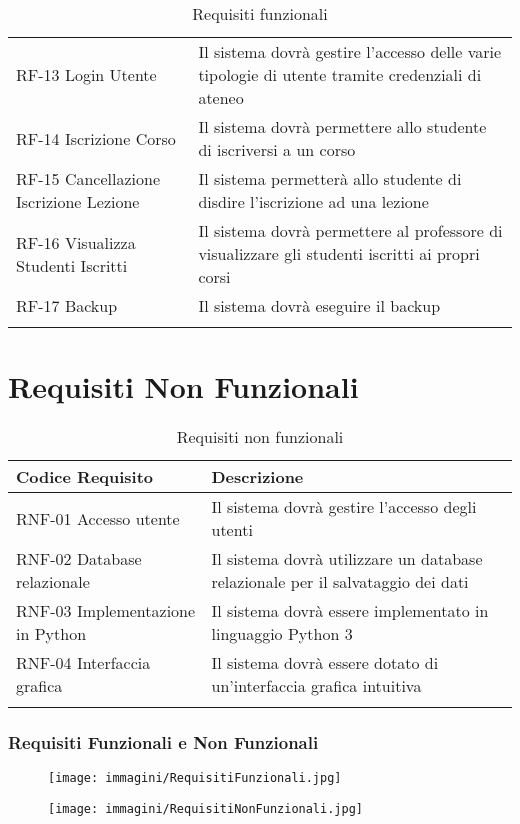 \documentclass[11pt,a4paper]{report}
\begin{document}
\begin{longtable}{>{\raggedright\arraybackslash}p{5cm} >{\raggedright\arraybackslash}p{10cm}}
RF-13 Login Utente & Il sistema dovrà gestire l’accesso delle varie tipologie di utente tramite credenziali di ateneo \\
\rowcolor{rowgray}
RF-14 Iscrizione Corso & Il sistema dovrà permettere allo studente di iscriversi a un corso \\
\rowcolor{white}
RF-15 Cancellazione Iscrizione Lezione & Il sistema permetterà allo studente di disdire l'iscrizione ad una lezione\\
\rowcolor{rowgray}
RF-16 Visualizza Studenti Iscritti& Il sistema dovrà permettere al professore di visualizzare gli studenti iscritti ai propri corsi \\
\rowcolor{white}
RF-17 Backup & Il sistema dovrà eseguire il backup\\
\bottomrule
\caption{Requisiti funzionali}
\end{longtable}
\newpage
\section{Requisiti Non Funzionali}
\begin{longtable}{>{\raggedright\arraybackslash}p{5cm} >{\raggedright\arraybackslash}p{10cm}}
\toprule
\rowcolor{headergray}
\textbf{Codice Requisito} & \textbf{Descrizione} \\
\midrule
\rowcolor{white}
RNF-01 Accesso utente & Il sistema dovrà gestire l'accesso degli utenti \\
\rowcolor{rowgray}
RNF-02 Database relazionale & Il sistema dovrà utilizzare un database relazionale per il salvataggio dei dati \\
\rowcolor{white}
RNF-03 Implementazione in Python & Il sistema dovrà essere implementato in linguaggio Python 3 \\
\rowcolor{rowgray}
RNF-04 Interfaccia grafica & Il sistema dovrà essere dotato di un'interfaccia grafica intuitiva \\
\bottomrule
\caption{Requisiti non funzionali}
\end{longtable}
\newpage

\subsubsection{Requisiti Funzionali e Non Funzionali}
\begin{figure}[h!]
  \centering
 \texttt{[image: immagini/RequisitiFunzionali.jpg]}
\end{figure}
\begin{figure}[h!]
  \centering
\texttt{[image: immagini/RequisitiNonFunzionali.jpg]}
\end{figure}
\newpage
\end{document}
